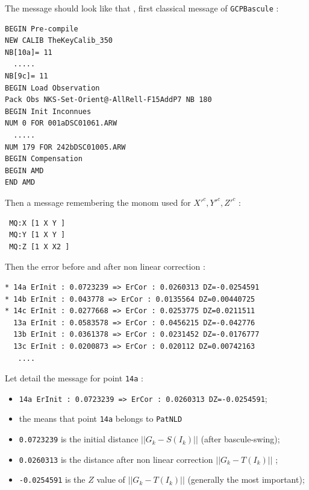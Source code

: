 The message should look like that , first classical message of {\tt GCPBascule} :

\begin{verbatim}
BEGIN Pre-compile
NEW CALIB TheKeyCalib_350
NB[10a]= 11
  .....
NB[9c]= 11
BEGIN Load Observation
Pack Obs NKS-Set-Orient@-AllRell-F15AddP7 NB 180
BEGIN Init Inconnues
NUM 0 FOR 001aDSC01061.ARW
  .....
NUM 179 FOR 242bDSC01005.ARW
BEGIN Compensation
BEGIN AMD
END AMD
\end{verbatim}

Then  a message remembering the monom used for $X'^c,Y'^c,Z'^c$ :

\begin{verbatim}
 MQ:X [1 X Y ]
 MQ:Y [1 X Y ]
 MQ:Z [1 X X2 ]
\end{verbatim}

Then the error before and after non linear correction :

\begin{verbatim}
* 14a ErInit : 0.0723239 => ErCor : 0.0260313 DZ=-0.0254591
* 14b ErInit : 0.043778 => ErCor : 0.0135564 DZ=0.00440725
* 14c ErInit : 0.0277668 => ErCor : 0.0253775 DZ=0.0211511
  13a ErInit : 0.0583578 => ErCor : 0.0456215 DZ=-0.042776
  13b ErInit : 0.0361378 => ErCor : 0.0231452 DZ=-0.0176777
  13c ErInit : 0.0200873 => ErCor : 0.020112 DZ=0.00742163
   ....
\end{verbatim}

Let detail the message for point {\tt  14a} :
\begin{itemize}

 \item {\tt * 14a ErInit : 0.0723239 => ErCor : 0.0260313 DZ=-0.0254591};
 \item the {\tt *} means that point {\tt  14a} belongs to {\tt PatNLD}
 \item {\tt 0.0723239} is the initial distance $||G_k - S(I_k)||$ (after bascule-swing);
 \item {\tt 0.0260313} is the distance after non linear correction $||G_k - T(I_k)||$ ;
 \item {\tt -0.0254591} is the $Z$ value of $||G_k - T(I_k)||$ (generally the most important);

\end{itemize}







